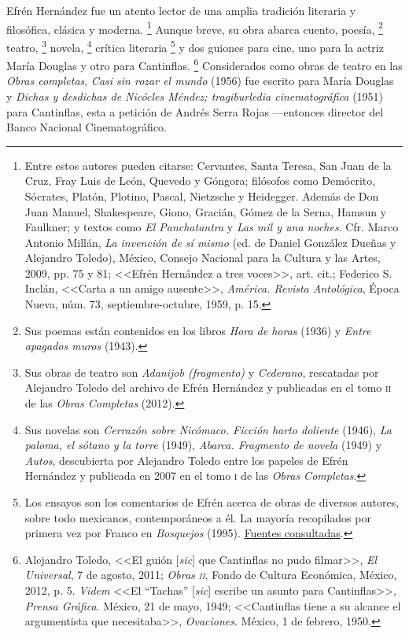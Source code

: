 \documentclass[14pt,twoside,final]{extbook} %
\let\oldfootnote\footnote
\renewcommand\footnote[1]{%
\oldfootnote{\hspace{1mm}#1}}
\begin{document}
Efrén Hernández fue un atento lector de una amplia tradición literaria y filosófica, clásica y moderna.\footnote{Entre estos autores pueden citarse: Cervantes, Santa Teresa, San Juan de la Cruz, Fray Luis de León, Quevedo y Góngora; filósofos como Demócrito, Sócrates, Platón, Plotino, Pascal, Nietzsche y Heidegger. Además de Don Juan Manuel, Shakespeare, Giono, Gracián, Gómez de la Serna, Hamsun
y Faulkner; y textos como \emph{El Panchatantra} y \emph{Las mil y una noches}. Cfr. Marco Antonio Millán, \emph{La invención de sí mismo} (ed. de Daniel González Dueñas y Alejandro Toledo), México, Consejo Nacional para la Cultura y las Artes, 2009, pp. 75 y 81; <<Efrén Hernández a tres voces>>, art. cit.; Federico S.\,Inclán, <<Carta a un amigo ausente>>, \emph{América. Revista Antológica}, Época Nueva, núm. 73, septiembre-octubre, 1959, p. 15.} Aunque breve, su obra abarca cuento, poesía,\footnote{Sus poemas están contenidos en los libros \emph{Hora de horas} (1936) y \emph{Entre apagados muros} (1943).} teatro,\footnote{Sus obras de teatro son \emph{Adanijob (fragmento)} y \emph{Cederano}, rescatadas por Alejandro Toledo del archivo de Efrén Hernández y publicadas en el tomo \textsc{ii} de las \emph{Obras Completas} (2012).} novela,\footnote{Sus novelas son \emph{Cerrazón sobre Nicómaco. Ficción harto doliente} (1946), \emph{La paloma, el sótano y la torre} (1949), \emph{Abarca. Fragmento de novela} (1949) y \emph{Autos}, descubierta por Alejandro Toledo entre los papeles de Efrén Hernández y publicada en 2007 en el tomo \textsc{i} de las \emph{Obras Completas}.} crítica literaria\footnote{Los ensayos son los comentarios de Efrén acerca de obras de diversos autores, sobre todo
mexicanos, contemporáneos a él. La mayoría recopilados por primera vez por Franco en \emph{Bosquejos} (1995). \ding{43} \hyperref[bib:franco1995]{Fuentes consultadas}.} y dos guiones para cine, uno para la actriz María Douglas y otro para Cantinflas.\footnote{Alejandro Toledo, <<El guión [\emph{sic}] que Cantinflas no pudo filmar>>, \emph{El Universal}, 7 de agosto, 2011; \emph{Obras \textsc{ii}}, Fondo de Cultura Económica, México, 2012, p. 5. \emph{Videm} <<El ``Tachas'' [\emph{sic}] escribe un asunto para Cantinflas>>, \emph{Prensa Gráfica}. México, 21 de mayo, 1949; <<Cantinflas tiene a su alcance el argumentista que necesitaba>>,  \emph{Ovaciones}. México, 1 de febrero, 1950.} Considerados como obras de teatro en las \emph{Obras completas}, \emph{Casi sin rozar el mundo} (1956) fue escrito para María Douglas y \emph{Dichas y desdichas de Nicócles Méndez; tragiburledia cinematográfica} (1951) para Cantinflas, esta a petición de Andrés Serra Rojas ---entonces director del Banco Nacional Cinematográfico.
\end{document}
